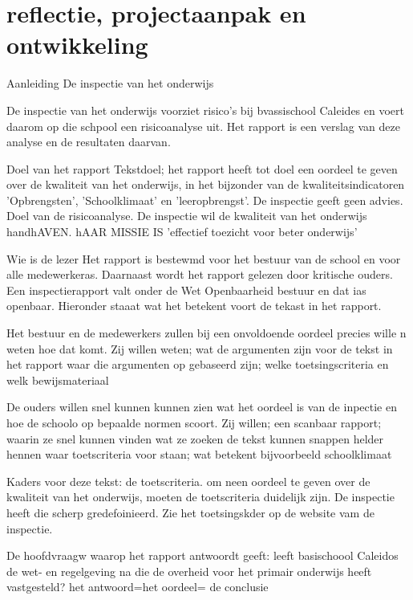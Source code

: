 			
			
			
			\part{reflectie, projectaanpak en ontwikkeling}
			
			
			Aanleiding
			De inspectie van het onderwijs
			
			De inspectie van het onderwijs voorziet risico's bij bvassischool Caleides en voert daarom op die schpool een risicoanalyse uit. Het rapport is een verslag van deze analyse en de resultaten daarvan.
			
			Doel van het rapport
			Tekstdoel; het rapport heeft tot doel een oordeel te geven over de kwaliteit van het onderwijs, in het bijzonder van de kwaliteitsindicatoren 'Opbrengsten', 'Schoolklimaat' en 'leeropbrengst'. De inspectie geeft geen advies.
			Doel van de risicoanalyse. De inspectie wil de kwaliteit  van het onderwijs handhAVEN. hAAR MISSIE IS 'effectief toezicht  voor beter onderwijs'
			
			
			Wie is de lezer
			Het rapport is bestewmd voor het bestuur van de school en voor alle medewerkeras. Daarnaast wordt het rapport gelezen door kritische ouders. Een inspectierapport valt onder de Wet Openbaarheid bestuur en dat ias openbaar. Hieronder staaat wat het betekent voort de tekast in het rapport.
			
			Het bestuur en de medewerkers zullen bij een onvoldoende oordeel precies wille n weten hoe dat komt. Zij willen weten;
			wat de  argumenten zijn voor de tekst in het rapport
			waar die argumenten op gebaseerd zijn; welke toetsingscriteria en welk bewijsmateriaal
			
			
			De ouders willen snel kunnen kunnen zien wat het oordeel is van de inpectie en hoe de schoolo op bepaalde normen scoort. Zij willen;
			een scanbaar rapport; waarin ze snel kunnen vinden wat ze zoeken
			de tekst kunnen snappen
			helder hennen waar toetscriteria voor staan; wat betekent bijvoorbeeld schoolklimaat
			
			
			Kaders voor deze tekst: de toetscriteria. om neen oordeel te geven over de kwaliteit van het onderwijs, moeten de toetscriteria duidelijk zijn. De inspectie heeft die scherp gredefoinieerd. Zie het toetsingskder op de website vam de inspectie.
			
			De hoofdvraagw waarop het rapport antwoordt geeft: leeft basischoool Caleidos de wet- en regelgeving na die de overheid voor het primair onderwijs heeft vastgesteld? het antwoord=het oordeel= de conclusie
			
